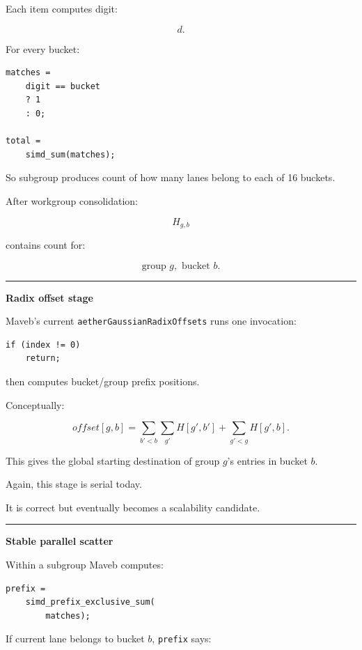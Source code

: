 Each item computes digit:

\[
d.
\]

For every bucket:

\protect{}\label{45mfzb}%
\begin{verbatim}
matches =
    digit == bucket
    ? 1
    : 0;

total =
    simd_sum(matches);
\end{verbatim}

So subgroup produces count of how many lanes belong to each of 16 buckets.

After workgroup consolidation:

\[
H_{g,b}
\]

contains count for:

\[
\text{group }g,
\text{ bucket }b.
\]

\begin{center}\rule{0.5\linewidth}{0.5pt}\end{center}

\textbf{Radix offset stage}

Maveb's current \texttt{aetherGaussianRadixOffsets} runs one invocation:

\protect{}\label{akbc8n}%
\begin{verbatim}
if (index != 0)
    return;
\end{verbatim}

then computes bucket/group prefix positions.

Conceptually:

\[
offset[g,b]
=
\sum_{b'<b}
\sum_{g'}H[g',b']
+
\sum_{g'<g}H[g',b].
\]

This gives the global starting destination of group \(g\)'s entries in bucket \(b\).

Again, this stage is serial today.

It is correct but eventually becomes a scalability candidate.

\begin{center}\rule{0.5\linewidth}{0.5pt}\end{center}

\textbf{Stable parallel scatter}

Within a subgroup Maveb computes:

\protect{}\label{bypw71}%
\begin{verbatim}
prefix =
    simd_prefix_exclusive_sum(
        matches);
\end{verbatim}

If current lane belongs to bucket \(b\), \texttt{prefix} says:

